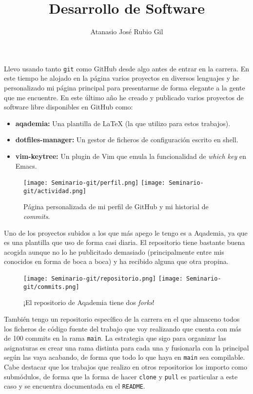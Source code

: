 \documentclass[10pt, a4paper]{aqademic}
\author{Atanasio José Rubio Gil}
\title{Desarrollo de Software}
\begin{document}
\AqMaketitle[%
	author   = Atanasio José Rubio Gil,
	cover    = logo-ugr.png,
	org      = Grado en Ingeniería Informática,
	subtitle = Seminario de \texttt{git} y GitHub,
	url      = https://github.com/Groctel/ugr-informatica
]

Llevo usando tanto \texttt{git} como GitHub desde algo antes de entrar en la carrera.
En este tiempo he alojado en la página varios proyectos en diversos lenguajes y he personalizado mi página principal para presentarme de forma elegante a la gente que me encuentre.
En este último año he creado y publicado varios proyectos de software libre disponibles en GitHub como:

\begin{itemize}
	\item\textbf{aqademia:}
		Una plantilla de {\LaTeX} (la que utilizo para estos trabajos).
	\item\textbf{dotfiles-manager:}
		Un gestor de ficheros de configuración escrito en shell.
	\item\textbf{vim-keytree:}
		Un plugin de Vim que emula la funcionalidad de \textit{which key} en Emacs.
\end{itemize}

\begin{figure}[ht!]
\begin{center}
	\texttt{[image: Seminario-git/perfil.png]}
	\texttt{[image: Seminario-git/actividad.png]}
\end{center}
\caption{Página personalizada de mi perfil de GitHub y mi historial de \textit{commits}.}
\end{figure}

Uno de los proyectos subidos a los que más apego le tengo es a Aqademia, ya que es una plantilla que uso de forma casi diaria.
El repositorio tiene bastante buena acogida aunque no lo he publicitado demasiado (principalmente entre mis conocidos en forma de boca a boca) y ha recibido alguna que otra propina.

\begin{figure}[ht!]
\begin{center}
	\texttt{[image: Seminario-git/repositorio.png]}
	\texttt{[image: Seminario-git/commits.png]}
\end{center}
\caption{¡El repositorio de Aqademia tiene dos \textit{forks}!}
\end{figure}

\pagebreak

También tengo un repositorio específico de la carrera en el que almaceno todos los ficheros de código fuente del trabajo que voy realizando que cuenta con más de 100 commits en la rama \texttt{main}.
La estrategia que sigo para organizar las asignaturas es crear una rama distinta para cada una y fusionarla con la principal según las vaya acabando, de forma que todo lo que haya en \texttt{main} sea compilable.
Cabe destacar que los trabajos que realizo en otros repositorios los importo como submódulos, de forma que la forma de hacer \texttt{clone} y \texttt{pull} es particular a este caso y se encuentra documentada en el \texttt{README}.
\end{document}
